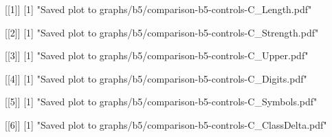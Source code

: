 [[1]]
[1] "Saved plot to graphs/b5/comparison-b5-controls-C_Length.pdf"

[[2]]
[1] "Saved plot to graphs/b5/comparison-b5-controls-C_Strength.pdf"

[[3]]
[1] "Saved plot to graphs/b5/comparison-b5-controls-C_Upper.pdf"

[[4]]
[1] "Saved plot to graphs/b5/comparison-b5-controls-C_Digits.pdf"

[[5]]
[1] "Saved plot to graphs/b5/comparison-b5-controls-C_Symbols.pdf"

[[6]]
[1] "Saved plot to graphs/b5/comparison-b5-controls-C_ClassDelta.pdf"

